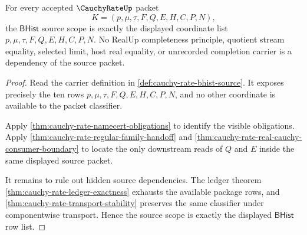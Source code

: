 \begin{theorem}
\label{thm:cauchy-rate-bhist-source-scope}
For every accepted $\CauchyRateUp$ packet
$$
K=(p,\mu,\tau,F,Q,E,H,C,P,N),
$$
the $\mathsf{BHist}$ source scope is exactly the displayed coordinate list $p,\mu,\tau,F,Q,E,H,C,P,N$. No RealUp completeness principle, quotient stream equality, selected limit, host real equality, or unrecorded completion carrier is a dependency of the source packet.
\end{theorem}
\begin{proof}
Read the carrier definition in \autoref{def:cauchy-rate-bhist-source}. It exposes precisely the ten rows $p,\mu,\tau,F,Q,E,H,C,P,N$, and no other coordinate is available to the packet classifier.

Apply \autoref{thm:cauchy-rate-namecert-obligations} to identify the visible obligations. Apply \autoref{thm:cauchy-rate-regular-family-handoff} and \autoref{thm:cauchy-rate-real-cauchy-consumer-boundary} to locate the only downstream reads of $Q$ and $E$ inside the same displayed source packet.

It remains to rule out hidden source dependencies. The ledger theorem \autoref{thm:cauchy-rate-ledger-exactness} exhausts the available package rows, and \autoref{thm:cauchy-rate-transport-stability} preserves the same classifier under componentwise transport. Hence the source scope is exactly the displayed $\mathsf{BHist}$ row list.
\end{proof}

